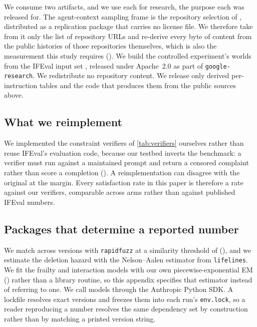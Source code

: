 We consume two artifacts, and we use each for
research, the purpose each was released for. The agent-context sampling frame
is the repository selection of \citet{chatlatanagulchai2025agentreadmes},
distributed as a replication package that carries no license file. We therefore
take from it only the list of repository URLs and re-derive every byte of
content from the public histories of those repositories themselves, which is
also the measurement this study requires
(). We build the controlled experiment's
worlds from the IFEval input set \citep{zhou2023ifeval}, released under
Apache~2.0 as part of \texttt{google-research}. We redistribute no repository
content. We release only derived per-instruction tables and the code that
produces them from the public sources above.

\subsection{What we reimplement}
\label{sec:appendix:reimplementation}

We implemented the \LabVerifierTypes{}
constraint verifiers of \autoref{tab:verifiers} ourselves rather than reuse
IFEval's evaluation code, because our testbed inverts the benchmark: a verifier
must run against a maintained prompt and return a censored complaint rather
than score a completion (). A reimplementation can
disagree with the original at the margin. Every satisfaction rate in this paper
is therefore a rate against our verifiers, comparable across arms rather than
against published IFEval numbers.

\subsection{Packages that determine a reported number}
\label{sec:appendix:packages}

We match across versions
with \texttt{rapidfuzz} at a similarity threshold of \MatchFuzzyThreshold{}
(), and we estimate the deletion hazard with the
Nelson--Aalen estimator from \texttt{lifelines}. We fit the frailty and
interaction models with our own piecewise-exponential EM
() rather than a library routine, so this appendix
specifies that estimator instead of referring to one. We call models through
the Anthropic Python SDK. A lockfile resolves exact versions and freezes them
into each run's \texttt{env.lock}, so a reader reproducing a number resolves the
same dependency set by construction rather than by matching a printed version
string.

